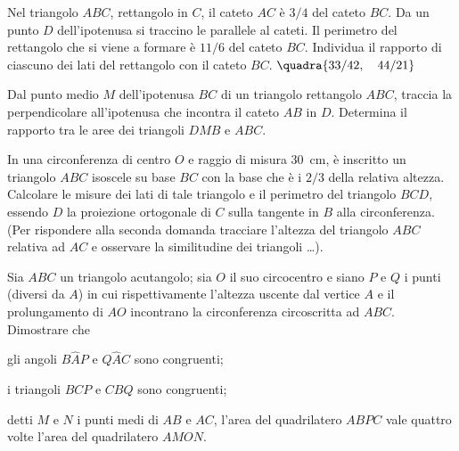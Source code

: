 \begin{multicols}{2}

\begin{esercizio}
\label{ese:6.93}
Nel triangolo \(ABC\), rettangolo in \(C\), il cateto \(AC\) è \(3/4\) del 
cateto \(BC\). Da un punto \(D\) dell'ipotenusa si traccino le parallele 
al cateti. Il perimetro del rettangolo che si viene a formare è 
\(11/6\) del cateto \(BC\). Individua il rapporto di ciascuno dei lati 
del rettangolo con il cateto \(BC\).
\hfill\(\quadra{33/42,\quad 44/21}\)
\end{esercizio}

\begin{esercizio}
\label{ese:6.94}
Dal punto medio \(M\) dell'ipotenusa \(BC\) di un triangolo rettangolo 
\(ABC\), traccia la perpendicolare all'ipotenusa che incontra il cateto 
\(AB\) in \(D\). Determina il rapporto tra le aree dei triangoli \(DMB\) e 
\(ABC\).
\end{esercizio}

\begin{esercizio}
\label{ese:6.95}
In una circonferenza di centro \(O\) e raggio di misura 30~cm, è 
inscritto un triangolo \(ABC\) isoscele su base \(BC\) con la base che è 
i \(2/3\) della relativa altezza. Calcolare le misure dei lati di tale 
triangolo e il perimetro del triangolo \(BCD\), essendo \(D\) la 
proiezione ortogonale di \(C\) sulla tangente in \(B\) alla 
circonferenza. (Per rispondere alla seconda domanda tracciare 
l'altezza del triangolo \(ABC\) relativa ad \(AC\) e osservare la 
similitudine dei triangoli \ldots{}).
\end{esercizio}

\end{multicols}

\begin{esercizio}
\label{ese:6.96}
Sia \(ABC\) un triangolo acutangolo; sia \(O\) il suo circocentro e siano 
\(P\) e \(Q\) i punti (diversi da \(A\)) in cui rispettivamente l'altezza 
uscente dal vertice \(A\) e il prolungamento di \(AO\) incontrano la 
circonferenza circoscritta ad \(ABC\). Dimostrare che
\begin{enumeratea}
\item gli angoli \(B\widehat{A}P\) e \(Q\widehat{A}C\) sono congruenti;
\item i triangoli \(BCP\) e \(CBQ\) sono congruenti;
\item detti \(M\) e \(N\) i punti medi di \(AB\) e \(AC\), l'area del 
quadrilatero \(ABPC\) vale quattro volte l'area del quadrilatero \(AMON\).
\end{enumeratea}
\end{esercizio}

